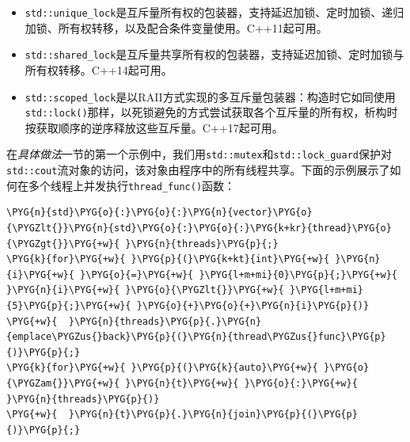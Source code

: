 \begin{itemize}

\item \texttt{std::\allowbreak{}unique\_\allowbreak{}lock}是互斥量所有权的包装器，支持延迟加锁、定时加锁、递归加锁、所有权转移，以及配合条件变量使用。C++11起可用。



\item \texttt{std::\allowbreak{}shared\_\allowbreak{}lock}是互斥量共享所有权的包装器，支持延迟加锁、定时加锁与所有权转移。C++14起可用。



\item \texttt{std::\allowbreak{}scoped\_\allowbreak{}lock}是以RAII方式实现的多互斥量包装器：构造时它如同使用\texttt{std::\allowbreak{}lock()}那样，以死锁避免的方式尝试获取各个互斥量的所有权，析构时按获取顺序的逆序释放这些互斥量。C++17起可用。

\end{itemize}



在\textit{具体做法}一节的第一个示例中，我们用\texttt{std::\allowbreak{}mutex}和\texttt{std::\allowbreak{}lock\_\allowbreak{}guard}保护对\texttt{std::\allowbreak{}cout}流对象的访问，该对象由程序中的所有线程共享。下面的示例展示了如何在多个线程上并发执行\texttt{thread\_\allowbreak{}func()}函数：



\begin{codeblockbg}
\begin{Verbatim}[commandchars=\\\{\},breaklines=true,breakanywhere=true,fontsize=\codefont,xleftmargin=17bp]
\PYG{n}{std}\PYG{o}{:}\PYG{o}{:}\PYG{n}{vector}\PYG{o}{\PYGZlt{}}\PYG{n}{std}\PYG{o}{:}\PYG{o}{:}\PYG{k+kr}{thread}\PYG{o}{\PYGZgt{}}\PYG{+w}{ }\PYG{n}{threads}\PYG{p}{;}
\PYG{k}{for}\PYG{+w}{ }\PYG{p}{(}\PYG{k+kt}{int}\PYG{+w}{ }\PYG{n}{i}\PYG{+w}{ }\PYG{o}{=}\PYG{+w}{ }\PYG{l+m+mi}{0}\PYG{p}{;}\PYG{+w}{ }\PYG{n}{i}\PYG{+w}{ }\PYG{o}{\PYGZlt{}}\PYG{+w}{ }\PYG{l+m+mi}{5}\PYG{p}{;}\PYG{+w}{ }\PYG{o}{+}\PYG{o}{+}\PYG{n}{i}\PYG{p}{)}
\PYG{+w}{  }\PYG{n}{threads}\PYG{p}{.}\PYG{n}{emplace\PYGZus{}back}\PYG{p}{(}\PYG{n}{thread\PYGZus{}func}\PYG{p}{)}\PYG{p}{;}
\PYG{k}{for}\PYG{+w}{ }\PYG{p}{(}\PYG{k}{auto}\PYG{+w}{ }\PYG{o}{\PYGZam{}}\PYG{+w}{ }\PYG{n}{t}\PYG{+w}{ }\PYG{o}{:}\PYG{+w}{ }\PYG{n}{threads}\PYG{p}{)}
\PYG{+w}{  }\PYG{n}{t}\PYG{p}{.}\PYG{n}{join}\PYG{p}{(}\PYG{p}{)}\PYG{p}{;}
\end{Verbatim}
\end{codeblockbg}


